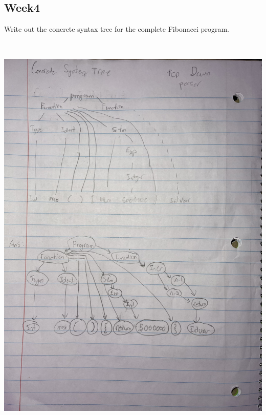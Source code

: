 \documentclass{article}
\theoremstyle{theorem}
\theoremstyle{definition}
\theoremstyle{remark}
\begin{document}
\subsection{Week4}
Write out the concrete syntax tree for the complete Fibonacci program.
\medskip\begin{center}
\includegraphics[width=15cm, height=20cm]{Week4P1.pdf}
\end{center}
\clearpage
\end{document}
